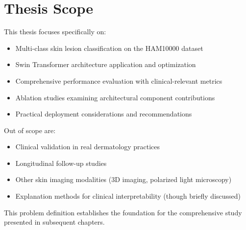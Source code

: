 \section{Thesis Scope}

This thesis focuses specifically on:

\begin{itemize}
    \item Multi-class skin lesion classification on the HAM10000 dataset
    \item Swin Transformer architecture application and optimization
    \item Comprehensive performance evaluation with clinical-relevant metrics
    \item Ablation studies examining architectural component contributions
    \item Practical deployment considerations and recommendations
\end{itemize}

Out of scope are:

\begin{itemize}
    \item Clinical validation in real dermatology practices
    \item Longitudinal follow-up studies
    \item Other skin imaging modalities (3D imaging, polarized light microscopy)
    \item Explanation methods for clinical interpretability (though briefly discussed)
\end{itemize}

This problem definition establishes the foundation for the comprehensive study presented in subsequent chapters.
